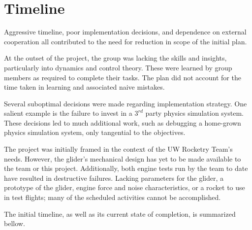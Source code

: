 \documentclass{sydeStyle}
\begin{document}
\appendix

\chapter{Timeline}


Aggressive timeline, poor implementation decisions, and dependence on external
cooperation all contributed to the need for reduction in scope of the initial
plan.

At the outset of the project, the group was lacking the skills and insights,
particularly into dynamics and control theory. These were learned by group
members as required to complete their tasks. The plan did not account for the
time taken in learning and associated naive mistakes.

Several suboptimal decisions were made regarding implementation strategy. One
salient example is the failure to invest in a $3^{rd}$ party physics simulation
system. These decisions led to much additional work, such as debugging a
home-grown physics simulation system, only tangential to the objectives.

The project was initially framed in the context of the UW Rocketry Team's needs.
However, the glider's mechanical design has yet to be made available to the team or
this project. Additionally, both engine tests run by the team to date have
resulted in destructive failures. Lacking parameters for the glider, a prototype
of the glider, engine force and noise characteristics, or a rocket to use in
test flights; many of the scheduled activities cannot be accomplished.

The initial timeline, as well as its current state of completion, is summarized
bellow.
\end{document}
